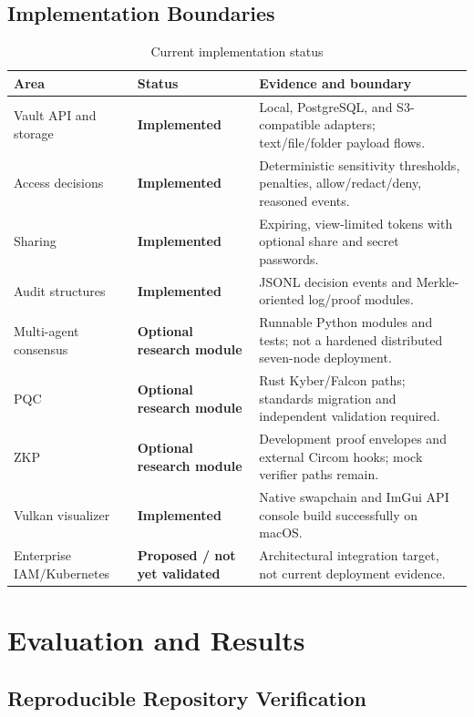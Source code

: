 \documentclass[10pt]{article}
\newcommand{\statusimplemented}{\textbf{Implemented}}
\newcommand{\statusoptional}{\textbf{Optional research module}}
\newcommand{\statusproposed}{\textbf{Proposed / not yet validated}}
\begin{document}
\subsection*{Implementation Boundaries}

\begin{table}[ht]
\centering
\caption{Current implementation status}
\label{tab:status}
\begin{tabularx}{\textwidth}{l l Y}
\toprule
\textbf{Area} & \textbf{Status} & \textbf{Evidence and boundary}\\
\midrule
Vault API and storage & \statusimplemented & Local, PostgreSQL, and S3-compatible adapters; text/file/folder payload flows.\\
Access decisions & \statusimplemented & Deterministic sensitivity thresholds, penalties, allow/redact/deny, reasoned events.\\
Sharing & \statusimplemented & Expiring, view-limited tokens with optional share and secret passwords.\\
Audit structures & \statusimplemented & JSONL decision events and Merkle-oriented log/proof modules.\\
Multi-agent consensus & \statusoptional & Runnable Python modules and tests; not a hardened distributed seven-node deployment.\\
PQC & \statusoptional & Rust Kyber/Falcon paths; standards migration and independent validation required.\\
ZKP & \statusoptional & Development proof envelopes and external Circom hooks; mock verifier paths remain.\\
Vulkan visualizer & \statusimplemented & Native swapchain and ImGui API console build successfully on macOS.\\
Enterprise IAM/Kubernetes & \statusproposed & Architectural integration target, not current deployment evidence.\\
\bottomrule
\end{tabularx}
\end{table}

\section*{Evaluation and Results}

\subsection*{Reproducible Repository Verification}
\end{document}
